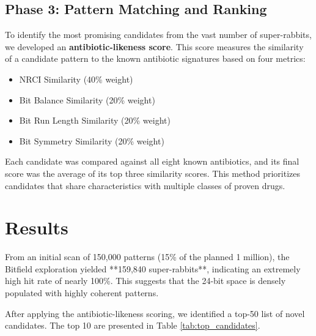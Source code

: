 \documentclass[12pt, a4paper]{article}
\begin{document}
\subsection{Phase 3: Pattern Matching and Ranking}

To identify the most promising candidates from the vast number of super-rabbits, we developed an \textbf{antibiotic-likeness score}. This score measures the similarity of a candidate pattern to the known antibiotic signatures based on four metrics:

\begin{itemize}
    \item NRCI Similarity (40\% weight)
    \item Bit Balance Similarity (20\% weight)
    \item Bit Run Length Similarity (20\% weight)
    \item Bit Symmetry Similarity (20\% weight)
\end{itemize}

Each candidate was compared against all eight known antibiotics, and its final score was the average of its top three similarity scores. This method prioritizes candidates that share characteristics with multiple classes of proven drugs.

\section{Results}

From an initial scan of 150,000 patterns (15\% of the planned 1 million), the Bitfield exploration yielded **159,840 super-rabbits**, indicating an extremely high hit rate of nearly 100\%. This suggests that the 24-bit space is densely populated with highly coherent patterns.

After applying the antibiotic-likeness scoring, we identified a top-50 list of novel candidates. The top 10 are presented in Table \ref{tab:top_candidates}.
\end{document}
